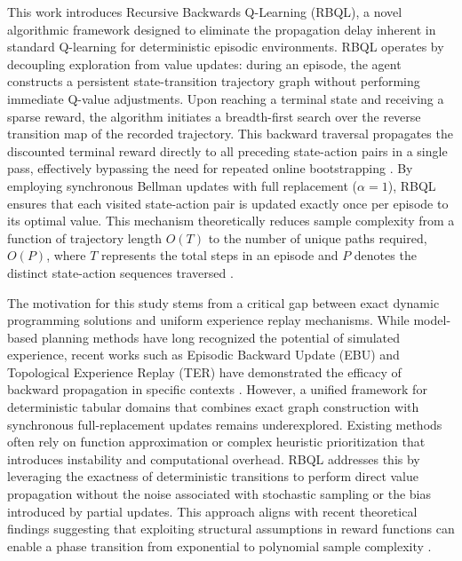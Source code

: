 \documentclass[manuscript, screen, review]{jair}
\begin{document}
This work introduces Recursive Backwards Q-Learning (RBQL), a novel algorithmic framework designed to eliminate the propagation delay inherent in standard Q-learning for deterministic episodic environments. RBQL operates by decoupling exploration from value updates: during an episode, the agent constructs a persistent state-transition trajectory graph without performing immediate Q-value adjustments. Upon reaching a terminal state and receiving a sparse reward, the algorithm initiates a breadth-first search over the reverse transition map of the recorded trajectory. This backward traversal propagates the discounted terminal reward directly to all preceding state-action pairs in a single pass, effectively bypassing the need for repeated online bootstrapping \cite{Diekhoff2024RecursiveBQ}. By employing synchronous Bellman updates with full replacement ($\alpha=1$), RBQL ensures that each visited state-action pair is updated exactly once per episode to its optimal value. This mechanism theoretically reduces sample complexity from a function of trajectory length $O(T)$ to the number of unique paths required, $O(P)$, where $T$ represents the total steps in an episode and $P$ denotes the distinct state-action sequences traversed \cite{Lee2018SampleEfficientDR}.

The motivation for this study stems from a critical gap between exact dynamic programming solutions and uniform experience replay mechanisms. While model-based planning methods have long recognized the potential of simulated experience, recent works such as Episodic Backward Update (EBU) and Topological Experience Replay (TER) have demonstrated the efficacy of backward propagation in specific contexts \cite{Lee2018SampleEfficientDR,Hong2022TopologicalER}. However, a unified framework for deterministic tabular domains that combines exact graph construction with synchronous full-replacement updates remains underexplored. Existing methods often rely on function approximation or complex heuristic prioritization that introduces instability and computational overhead. RBQL addresses this by leveraging the exactness of deterministic transitions to perform direct value propagation without the noise associated with stochastic sampling or the bias introduced by partial updates. This approach aligns with recent theoretical findings suggesting that exploiting structural assumptions in reward functions can enable a phase transition from exponential to polynomial sample complexity \cite{Shihab2025WhatFS}.
\end{document}
